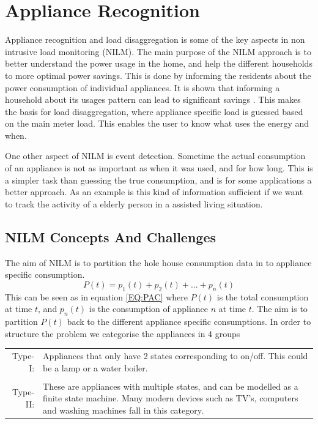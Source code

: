 \chapter{Appliance Recognition }

Appliance recognition and load disaggregation is some of the key aspects in non intrusive load monitoring (NILM). The main purpose of the NILM approach is to better understand the power usage in the home, and help the different households to more optimal power savings. This is done by informing the residents about the power consumption of individual appliances. It is shown that informing a household about its usages pattern can lead to significant savings \citep{RefWorks:33}. This makes the basis for load disaggregation, where appliance specific load is guessed based on the main meter load. This enables the user to know what uses the energy and when.

One other aspect of NILM is event detection. Sometime the actual consumption of an appliance is not as important as when it was used, and for how long. This is a simpler task than guessing the true consumption, and is for some applications a better approach. As an example is this kind of information sufficient if we want to track the activity of a elderly person in a assisted living situation. 

\section{NILM Concepts And Challenges} 
The aim of NILM is to partition the hole house consumption data in to appliance specific consumption. 
\begin{equation}
	P(t) = p_1(t) + p_2(t) + ... + p_n(t)
	\label{EQ:PAC}
\end{equation}
This can be seen as in equation \ref{EQ:PAC} where $P(t)$ is the total consumption at time $t$, and $p_n(t)$ is the consumption of appliance $n$ at time $t$. The aim is to partition $P(t)$ back to the different appliance specific consumptions. In order to structure the problem we categorise the appliances in 4 groups\citep{RefWorks:17} 

\begin{tabularx}{\linewidth}{ r X }
Type-I:&Appliances that only have 2 states corresponding to on/off. This could be a lamp or a water boiler. \\
\\
Type-II:&These are appliances with multiple states, and can be modelled as a finite state machine. Many modern devices such as TV's, computers and washing machines fall in this category.   \\
\end{tabularx}

